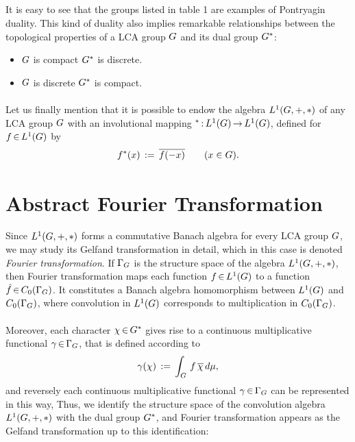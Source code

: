 \documentclass[11pt,twoside]{article}
\begin{document}
\subparagraph{}
It is easy to see
that the groups listed in table 1 are examples of Pontryagin duality.
This kind of duality also implies remarkable relationships between
the topological properties of a LCA group $G$ and its dual group $G^*$:

\begin{itemize}[leftmargin=15pt]
\item[1.]
$G$ is compact \iff $G^*$ is discrete.

\item[2.]
$G$ is discrete \iff $G^*$ is compact.
\end{itemize}

\paragraph{}
Let us finally mention
that it is possible to endow the algebra $L^1(G,+,\ast)$
of any LCA group $G$
with an involutional mapping $^* {\,:\,}L^1(G) {\,\to\,} L^1(G)$,
defined for $f {\,\in\,} L^1(G)$ by
\[
f^*(x) \,:=\, \overline{f(-x)} \quad \quad (x \in G).
\]

\section{Abstract Fourier Transformation}
Since $L^1(G,+,\ast)$ forms a commutative Banach algebra for every
LCA group $G$,
we may study its Gelfand transformation in detail,
which in this case is denoted \textit{Fourier transformation}.
If $\Gamma_{G}$ is the structure space of the algebra $L^1(G,+,\ast)$,
then Fourier transformation maps each function $f {\,\in\,} L^1(G)$
to a function $\hat{f} {\,\in\,} C_0(\Gamma_{G})$.
It constitutes a Banach algebra homomorphism
between $L^1(G)$ and $C_0(\Gamma_{G})$,
where convolution in $L^1(G)$ corresponds to multiplication
in $C_0(\Gamma_{G})$.

\paragraph{}
Moreover,
each character $\chi {\,\in\,} G^*$ gives rise to
a continuous multiplicative functional $\gamma {\,\in\,} \Gamma_{G}$,
that is defined according to
\[
\gamma(\chi) \,:=\, \int_{G} \, f \, \overline{\chi} \, d\mu,
\]
and reversely each continuous multiplicative functional
$\gamma {\,\in\,} \Gamma_{G}$ can be represented in this way,
Thus,
we identify the structure space of the convolution algebra $L^1(G,+,\ast)$
with the dual group $G^*$,
and Fourier transformation appears as the Gelfand transformation
up to this identification:
\end{document}
